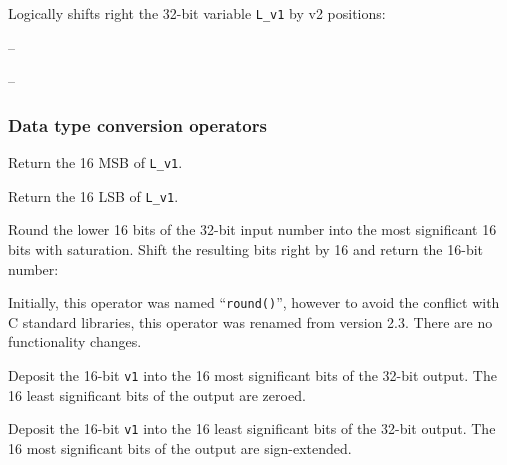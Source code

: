Logically shifts right the 32-bit variable {\tt L\_v1} by v2 positions:

 -- 

 -- 


\subsubsection{Data type conversion operators}


Return the 16 MSB of {\tt L\_v1}.


Return the 16 LSB of {\tt L\_v1}.


Round the lower 16 bits of the 32-bit input number into the most significant 16 bits with saturation.
Shift the resulting bits right by 16 and return the 16-bit number:


Initially, this operator was named ``{\tt round()}'', however to avoid the conflict with C standard libraries, this operator was renamed from version 2.3. There are no functionality changes.


Deposit the 16-bit {\tt v1} into the 16 most significant bits of the 32-bit output.
The 16 least significant bits of the output are zeroed.


Deposit the 16-bit {\tt v1} into the 16 least significant bits of the 32-bit output.
The 16 most significant bits of the output are sign-extended.



